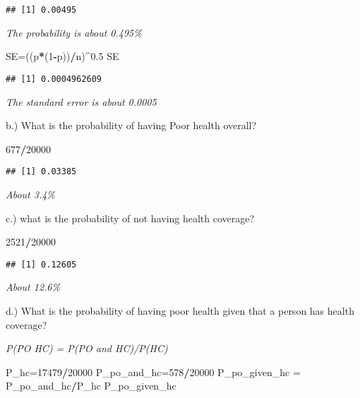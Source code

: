\documentclass[
]{article}
\newenvironment{Shaded}{\begin{snugshade}}{\end{snugshade}}
\newcommand{\DecValTok}[1]{\textcolor[rgb]{0.00,0.00,0.81}{#1}}
\newcommand{\FloatTok}[1]{\textcolor[rgb]{0.00,0.00,0.81}{#1}}
\newcommand{\NormalTok}[1]{#1}
\newcommand{\OtherTok}[1]{\textcolor[rgb]{0.56,0.35,0.01}{#1}}
\newcommand{\SpecialCharTok}[1]{\textcolor[rgb]{0.81,0.36,0.00}{\textbf{#1}}}
\begin{document}
\begin{verbatim}
## [1] 0.00495
\end{verbatim}

\emph{The probability is about 0.495\%}

\begin{Shaded}
\begin{Highlighting}[]
\NormalTok{SE}\OtherTok{=}\NormalTok{((p}\SpecialCharTok{*}\NormalTok{(}\DecValTok{1}\SpecialCharTok{{-}}\NormalTok{p))}\SpecialCharTok{/}\NormalTok{n)}\SpecialCharTok{\^{}}\FloatTok{0.5}
\NormalTok{SE}
\end{Highlighting}
\end{Shaded}

\begin{verbatim}
## [1] 0.0004962609
\end{verbatim}

\emph{The standard error is about 0.0005}

b.) What is the probability of having Poor health overall?

\begin{Shaded}
\begin{Highlighting}[]
\DecValTok{677}\SpecialCharTok{/}\DecValTok{20000}
\end{Highlighting}
\end{Shaded}

\begin{verbatim}
## [1] 0.03385
\end{verbatim}

\emph{About 3.4\%}

c.) what is the probability of not having health coverage?

\begin{Shaded}
\begin{Highlighting}[]
\DecValTok{2521}\SpecialCharTok{/}\DecValTok{20000}
\end{Highlighting}
\end{Shaded}

\begin{verbatim}
## [1] 0.12605
\end{verbatim}

\emph{About 12.6\%}

d.) What is the probability of having poor health given that a person
has health coverage?

\emph{P(PO \textbar{} HC) = P(PO and HC)/P(HC)}

\begin{Shaded}
\begin{Highlighting}[]
\NormalTok{P\_hc}\OtherTok{=}\DecValTok{17479}\SpecialCharTok{/}\DecValTok{20000}
\NormalTok{P\_po\_and\_hc}\OtherTok{=}\DecValTok{578}\SpecialCharTok{/}\DecValTok{20000}
\NormalTok{P\_po\_given\_hc }\OtherTok{=}\NormalTok{ P\_po\_and\_hc}\SpecialCharTok{/}\NormalTok{P\_hc}
\NormalTok{P\_po\_given\_hc}
\end{Highlighting}
\end{Shaded}
\end{document}

